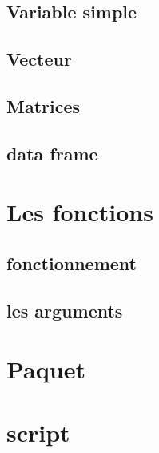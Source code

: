 \documentclass{beamer}
\begin{document}
	\subsection{Variable simple}
	\subsection{Vecteur}
	\subsection{Matrices}
	\subsection{data frame}
\section{Les fonctions}
	\subsection{fonctionnement}
	\subsection{les arguments}
\section{Paquet}
\section{script}



\end{document}

